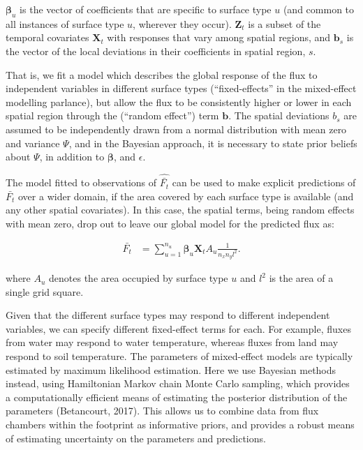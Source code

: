 \(\boldsymbol{\beta}_u\) is the vector of coefficients that are specific
to surface type \(u\) (and common to all instances of surface type
\(u\), wherever they occur). \(\mathbf{Z}_{t}\) is a subset of the
temporal covariates \(\mathbf{X}_{t}\) with responses that vary among
spatial regions, and \(\mathbf{b}_s\) is the vector of the local
deviations in their coefficients in spatial region, \(s\).

That is, we fit a model which describes the global response of the flux
to independent variables in different surface types (``fixed-effects''
in the mixed-effect modelling parlance), but allow the flux to be
consistently higher or lower in each spatial region through the
(``random effect'') term \(\mathbf{b}\). The spatial deviations \(b_s\)
are assumed to be independently drawn from a normal distribution with
mean zero and variance \(\Psi\), and in the Bayesian approach, it is
necessary to state prior beliefs about \(\Psi\), in addition to
\(\boldsymbol{\beta}\), and \(\epsilon\).

The model fitted to observations of \(\widehat{\bar{F_t}}\) can be used
to make explicit predictions of \(\bar{F_t}\) over a wider domain, if
the area covered by each surface type is available (and any other
spatial covariates). In this case, the spatial terms, being random
effects with mean zero, drop out to leave our global model for the
predicted flux as:

\begin{align}   \label{eq:pred_Fbar}
  \bar{F_t} &= \sum_{u = 1}^{n_u} \boldsymbol{\beta}_u \mathbf{X}_t A_{u} \frac{1}{n_x n_y l^2}.
\end{align}

where \(A_{u}\) denotes the area occupied by surface type \(u\) and
\(l^2\) is the area of a single grid square.

Given that the different surface types may respond to different
independent variables, we can specify different fixed-effect terms for
each. For example, fluxes from water may respond to water temperature,
whereas fluxes from land may respond to soil temperature. The parameters
of mixed-effect models are typically estimated by maximum likelihood
estimation. Here we use Bayesian methods instead, using Hamiltonian
Markov chain Monte Carlo sampling, which provides a computationally
efficient means of estimating the posterior distribution of the
parameters (Betancourt, 2017). This allows us to combine data from flux
chambers within the footprint as informative priors, and provides a
robust means of estimating uncertainty on the parameters and
predictions.

